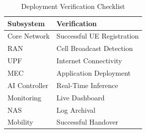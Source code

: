 \documentclass[12pt,a4paper]{article}\usepackage[a4paper,margin=1in]{geometry}\usepackage{graphicx}\usepackage{longtable}\usepackage{booktabs}\usepackage{hyperref}\usepackage{enumitem}\usepackage{amsmath}\usepackage{tikz}\usepackage{pgfgantt}\usepackage{setspace}\setstretch{1.15}\usetikzlibrary{positioning,arrows.meta,shapes.geometric}
\begin{document}
	\begin{table}[h]
		
		\centering
		
		\caption{Deployment Verification Checklist}
		
		\begin{tabular}{p{6cm}p{5cm}}
			
			\toprule
			
			Subsystem
			
			&
			
			Verification
			
			\\
			
			\midrule
			
			Core Network
			
			&
			
			Successful UE Registration
			
			\\
			
			RAN
			
			&
			
			Cell Broadcast Detection
			
			\\
			
			UPF
			
			&
			
			Internet Connectivity
			
			\\
			
			MEC
			
			&
			
			Application Deployment
			
			\\
			
			AI Controller
			
			&
			
			Real-Time Inference
			
			\\
			
			Monitoring
			
			&
			
			Live Dashboard
			
			\\
			
			NAS
			
			&
			
			Log Archival
			
			\\
			
			Mobility
			
			&
			
			Successful Handover
			
			\\
			
			\bottomrule
			
		\end{tabular}
		
	\end{table}
	
\end{document}
